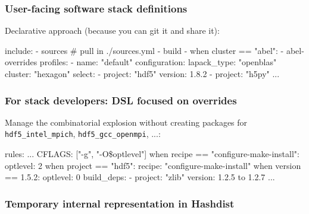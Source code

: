 \documentclass[sans,mathserif]{beamer}
\begin{document}


\begin{frame}[fragile]
\frametitle{User-facing software stack definitions}
Declarative approach (because you can git it and share it):

{\small

\begin{semiverbatim}
include:
  - sources # pull in ./sources.yml
  - build
  - when cluster == "abel":
    - abel-overrides
profiles:
  - name: "default"
    configuration:
      lapack_type: "openblas"
      cluster: "hexagon"
    select:
      - project: "hdf5"
        version: 1.8.2
      - project: "h5py"
        ...
\end{semiverbatim}
}
\end{frame}

\begin{frame}[fragile]
\frametitle{For stack developers: DSL focused on overrides}

Manage the combinatorial explosion without creating
packages for {\tt hdf5\_intel\_mpich}, {\tt hdf5\_gcc\_openmpi}, ...:
{

\begin{semiverbatim}
rules:
  ...
  CFLAGS: ["-g", "-O\$optlevel"]
  when recipe == "configure-make-install":
    optlevel: 2
  when project == "hdf5":
    recipe: "configure-make-install"
    when version == 1.5.2:
      optlevel: 0
    build_deps:
      - project: "zlib"
        version: 1.2.5 to 1.2.7
  ...
\end{semiverbatim}
}
\end{frame}

\begin{frame}[fragile]
  \frametitle{Temporary internal representation in Hashdist}

{\small
{}
}
\end{frame}
\end{document}

